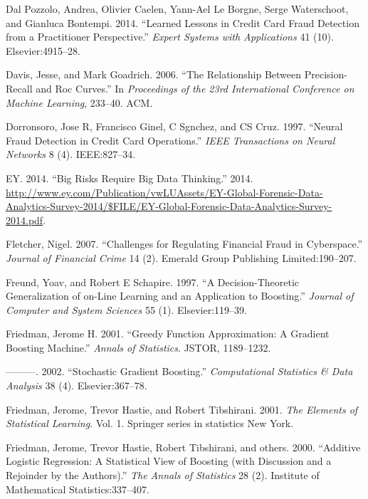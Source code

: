 \documentclass[12pt,]{article}
\begin{document}
\leavevmode\hypertarget{ref-dal2014learned}{}%
Dal Pozzolo, Andrea, Olivier Caelen, Yann-Ael Le Borgne, Serge
Waterschoot, and Gianluca Bontempi. 2014. ``Learned Lessons in Credit
Card Fraud Detection from a Practitioner Perspective.'' \emph{Expert
Systems with Applications} 41 (10). Elsevier:4915--28.

\leavevmode\hypertarget{ref-davis2006relationship}{}%
Davis, Jesse, and Mark Goadrich. 2006. ``The Relationship Between
Precision-Recall and Roc Curves.'' In \emph{Proceedings of the 23rd
International Conference on Machine Learning}, 233--40. ACM.

\leavevmode\hypertarget{ref-dorronsoro1997neural}{}%
Dorronsoro, Jose R, Francisco Ginel, C Sgnchez, and CS Cruz. 1997.
``Neural Fraud Detection in Credit Card Operations.'' \emph{IEEE
Transactions on Neural Networks} 8 (4). IEEE:827--34.

\leavevmode\hypertarget{ref-analytics_tools_table}{}%
EY. 2014. ``Big Risks Require Big Data Thinking.'' 2014.
\url{http://www.ey.com/Publication/vwLUAssets/EY-Global-Forensic-Data-Analytics-Survey-2014/$FILE/EY-Global-Forensic-Data-Analytics-Survey-2014.pdf}.

\leavevmode\hypertarget{ref-fletcher2007challenges}{}%
Fletcher, Nigel. 2007. ``Challenges for Regulating Financial Fraud in
Cyberspace.'' \emph{Journal of Financial Crime} 14 (2). Emerald Group
Publishing Limited:190--207.

\leavevmode\hypertarget{ref-freund1997decision}{}%
Freund, Yoav, and Robert E Schapire. 1997. ``A Decision-Theoretic
Generalization of on-Line Learning and an Application to Boosting.''
\emph{Journal of Computer and System Sciences} 55 (1). Elsevier:119--39.

\leavevmode\hypertarget{ref-friedman2001greedy}{}%
Friedman, Jerome H. 2001. ``Greedy Function Approximation: A Gradient
Boosting Machine.'' \emph{Annals of Statistics}. JSTOR, 1189--1232.

\leavevmode\hypertarget{ref-friedman2002stochastic}{}%
---------. 2002. ``Stochastic Gradient Boosting.'' \emph{Computational
Statistics \& Data Analysis} 38 (4). Elsevier:367--78.

\leavevmode\hypertarget{ref-friedman2001elements}{}%
Friedman, Jerome, Trevor Hastie, and Robert Tibshirani. 2001. \emph{The
Elements of Statistical Learning}. Vol. 1. Springer series in statistics
New York.

\leavevmode\hypertarget{ref-friedman2000additive}{}%
Friedman, Jerome, Trevor Hastie, Robert Tibshirani, and others. 2000.
``Additive Logistic Regression: A Statistical View of Boosting (with
Discussion and a Rejoinder by the Authors).'' \emph{The Annals of
Statistics} 28 (2). Institute of Mathematical Statistics:337--407.
\end{document}
